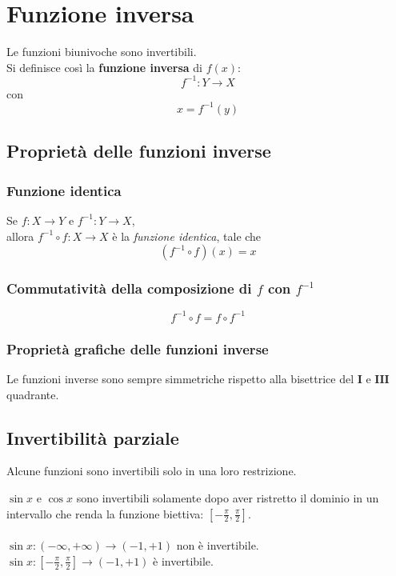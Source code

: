 \documentclass[a4paper,12pt, oneside]{book}
\begin{document}
\section{Funzione inversa}
\begin{definizione}
Le funzioni biunivoche sono invertibili.\\
Si definisce così la \textbf{funzione inversa} di $f(x)$:
\begin{equation}
f^{-1}:Y\rightarrow X
\end{equation}
con 
\begin{equation}
	x = f^{-1}(y)
\end{equation}
\end{definizione}
\subsection{Proprietà delle funzioni inverse}
\subsubsection{Funzione identica}
\begin{definizione}
Se $f:X\rightarrow Y$ e $f^{-1}:Y\rightarrow X$,\\
allora $f^{-1}\circ f: X \rightarrow X$ è la \emph{funzione identica}, tale che
\begin{equation}
(f^{-1}\circ f)(x)=x
\end{equation}
\end{definizione}
\subsubsection{Commutatività della composizione di $f$ con $f^{-1}$}
\begin{equation}
f^{-1}\circ f= f\circ f^{-1}
\end{equation}
\subsubsection{Proprietà grafiche delle funzioni inverse}
Le funzioni inverse sono sempre simmetriche rispetto alla bisettrice del $\mathbf{I}$ e $\mathbf{III}$ quadrante.
\subsection{Invertibilità parziale}
Alcune funzioni sono invertibili solo in una loro restrizione.
\begin{esempio}
$\sin{x}$ e $\cos{x}$ sono invertibili solamente dopo aver ristretto il dominio in un intervallo che renda la funzione biettiva: $[-\frac{\pi}{2}, \frac{\pi}{2}]$.\\\\
$\sin{x}: (-\infty, +\infty) \rightarrow (-1, +1)$ non è invertibile.\\
$\sin{x}: [-\frac{\pi}{2}, \frac{\pi}{2}] \rightarrow (-1, +1)$ è invertibile.
\end{esempio}
\end{document}
